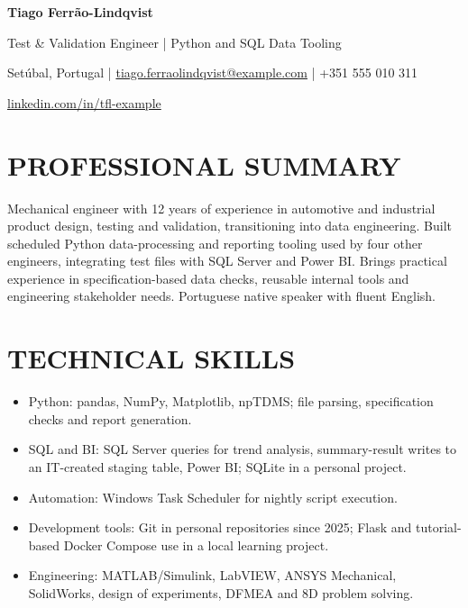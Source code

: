 \documentclass[11pt,a4paper]{article}
\newcommand{\cvsection}[1]{\section*{#1}}
\begin{document}
{\LARGE\bfseries\color{primarycolor} Tiago Ferrão-Lindqvist}\par
{\large\color{accentcolor} Test \& Validation Engineer | Python and SQL Data Tooling}\par
Setúbal, Portugal | \href{mailto:tiago.ferraolindqvist@example.com}{tiago.ferraolindqvist@example.com} | +351 555 010 311\par
\href{https://linkedin.com/in/tfl-example}{linkedin.com/in/tfl-example}

\cvsection{PROFESSIONAL SUMMARY}
Mechanical engineer with 12 years of experience in automotive and industrial product design, testing and validation, transitioning into data engineering. Built scheduled Python data-processing and reporting tooling used by four other engineers, integrating test files with SQL Server and Power BI. Brings practical experience in specification-based data checks, reusable internal tools and engineering stakeholder needs. Portuguese native speaker with fluent English.

\cvsection{TECHNICAL SKILLS}
\begin{itemize}
\item Python: pandas, NumPy, Matplotlib, npTDMS; file parsing, specification checks and report generation.
\item SQL and BI: SQL Server queries for trend analysis, summary-result writes to an IT-created staging table, Power BI; SQLite in a personal project.
\item Automation: Windows Task Scheduler for nightly script execution.
\item Development tools: Git in personal repositories since 2025; Flask and tutorial-based Docker Compose use in a local learning project.
\item Engineering: MATLAB/Simulink, LabVIEW, ANSYS Mechanical, SolidWorks, design of experiments, DFMEA and 8D problem solving.
\end{itemize}
\end{document}
